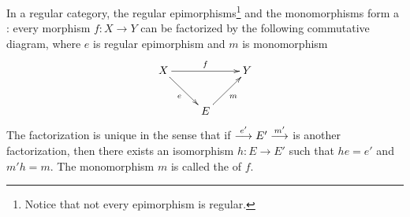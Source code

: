 In a regular category, the regular epimorphisms\footnote{Notice that not every epimorphism is regular.} and the monomorphisms form a :
every morphism $f\colon X\to Y$ can be factorized by the following commutative diagram, where $e$ is regular epimorphism and $m$ is monomorphism
\begin{displaymath}
      \xymatrix{
        X \ar[rr]^{f}\ar[dr]_{e}& &  Y \\
        & {E} \ar[ur]_{m}&
      }
\end{displaymath}
The factorization is unique in the sense that if $\stackrel{{e'}}{\longrightarrow} E'\stackrel{{m'}}{\longrightarrow}$ is another factorization, then there exists an isomorphism $h\colon E\to E'$ such that $he=e' $ and $m'h=m$.
The monomorphism $m$ is called the  of $f$.

